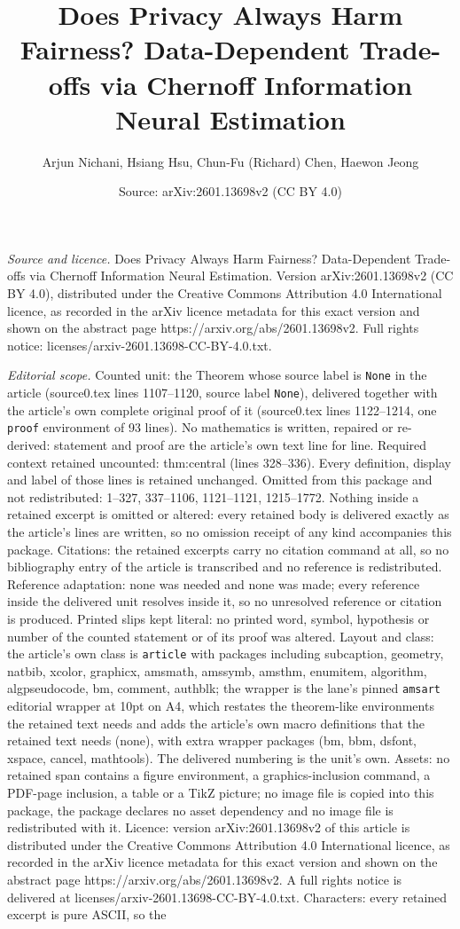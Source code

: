\documentclass[10pt,a4paper]{amsart}
\title[Does Privacy Always Harm Fairness? Data-Dependent Trade-offs]{Does Privacy Always Harm Fairness? Data-Dependent Trade-offs via Chernoff Information Neural Estimation}
\author{Arjun Nichani, Hsiang Hsu, Chun-Fu (Richard) Chen, Haewon Jeong}
\date{Source: arXiv:2601.13698v2 (CC BY 4.0)}
\begin{document}
\maketitle

\noindent\emph{Source and licence.} Does Privacy Always Harm Fairness? Data-Dependent Trade-offs via Chernoff Information Neural Estimation. Version arXiv:2601.13698v2 (CC BY 4.0), distributed under the Creative Commons Attribution 4.0 International licence, as recorded in the arXiv licence metadata for this exact version and shown on the abstract page https://arxiv.org/abs/2601.13698v2. Full rights notice: licenses/arxiv-2601.13698-CC-BY-4.0.txt.\par\smallskip

\noindent\textit{Editorial scope.} Counted unit: the Theorem whose source label is \texttt{None} in the article (source0.tex lines 1107--1120, source label \texttt{None}), delivered together with the article's own complete original proof of it (source0.tex lines 1122--1214, one \texttt{proof} environment of 93 lines). No mathematics is written, repaired or re-derived: statement and proof are the article's own text line for line. Required context retained uncounted: thm:central (lines 328--336). Every definition, display and label of those lines is retained unchanged. Omitted from this package and not redistributed: 1--327, 337--1106, 1121--1121, 1215--1772. Nothing inside a retained excerpt is omitted or altered: every retained body is delivered exactly as the article's lines are written, so no omission receipt of any kind accompanies this package. Citations: the retained excerpts carry no citation command at all, so no bibliography entry of the article is transcribed and no reference is redistributed. Reference adaptation: none was needed and none was made; every reference inside the delivered unit resolves inside it, so no unresolved reference or citation is produced. Printed slips kept literal: no printed word, symbol, hypothesis or number of the counted statement or of its proof was altered. Layout and class: the article's own class is \texttt{article} with packages including subcaption, geometry, natbib, xcolor, graphicx, amsmath, amssymb, amsthm, enumitem, algorithm, algpseudocode, bm, comment, authblk; the wrapper is the lane's pinned \texttt{amsart} editorial wrapper at 10pt on A4, which restates the theorem-like environments the retained text needs and adds the article's own macro definitions that the retained text needs (none), with extra wrapper packages (bm, bbm, dsfont, xspace, cancel, mathtools). The delivered numbering is the unit's own. Assets: no retained span contains a figure environment, a graphics-inclusion command, a PDF-page inclusion, a table or a TikZ picture; no image file is copied into this package, the package declares no asset dependency and no image file is redistributed with it. Licence: version arXiv:2601.13698v2 of this article is distributed under the Creative Commons Attribution 4.0 International licence, as recorded in the arXiv licence metadata for this exact version and shown on the abstract page https://arxiv.org/abs/2601.13698v2. A full rights notice is delivered at licenses/arxiv-2601.13698-CC-BY-4.0.txt. Characters: every retained excerpt is pure ASCII, so the 
\end{document}
